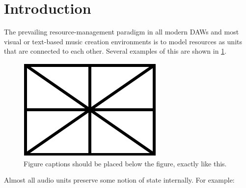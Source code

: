 \documentclass{article}
\title{\papertitle}
\begin{document}
%
\capstartfalse
\maketitle
\capstarttrue
%
\begin{abstract}
Audio programming languages fall into two broad categories: imperative (CSound, sclang) and functional (Faust, tidal). For the latter, the declarative and immutable nature of data and control structures are often at odds with the mutable and referentially opaque nature of audio units like oscillators and filters. Recently, languages such as Rust have simplified this task through zero-cost abstractions to manage resource allocation in otherwise functional settings. This paper applies these techniques to functional audio programming languages. In addition to correct and low-latency automatic audio memory management, we will see how these techniques allow for efficient namespacing, drastically reducing the amount of time it takes for ceratin graph traversals.
\end{abstract}
%

\section{Introduction}\label{sec:introduction}
The prevailing resource-management paradigm in all modern DAWs and most visual or text-based music creation environments is to model resources as units that are connected to each other. Several examples of this are shown in \ref{fig:audio-units}.

\begin{figure}[t]
\centering
\includegraphics[width=0.6\columnwidth]{figure}
\caption{Figure captions should be placed below the figure,
exactly like this.\label{fig:audio-units}}
\end{figure}


Almost all audio units preserve some notion of state internally. For example:
\end{document}
